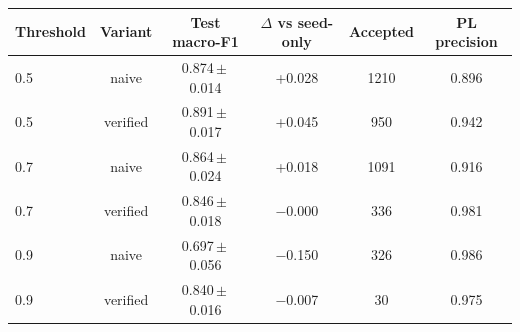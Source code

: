 \begin{tabular}{lccccc}
\toprule
Threshold & Variant & Test macro-F1 & $\Delta$ vs seed-only & Accepted & PL precision \\
\midrule
0.5 & naive & 0.874\,$\pm$\,0.014 & +0.028 & 1210 & 0.896 \\
0.5 & verified & 0.891\,$\pm$\,0.017 & +0.045 & 950 & 0.942 \\
0.7 & naive & 0.864\,$\pm$\,0.024 & +0.018 & 1091 & 0.916 \\
0.7 & verified & 0.846\,$\pm$\,0.018 & $-$0.000 & 336 & 0.981 \\
0.9 & naive & 0.697\,$\pm$\,0.056 & $-$0.150 & 326 & 0.986 \\
0.9 & verified & 0.840\,$\pm$\,0.016 & $-$0.007 & 30 & 0.975 \\
\bottomrule
\end{tabular}
